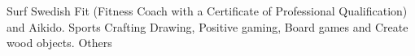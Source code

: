 \begin{cvhonors}
  \cvhonor
    {Surf}
    {Swedish Fit (Fitness Coach with a Certificate of Professional Qualification) and Aikido.}
    {}
    {Sports}
  \cvhonor
    {Crafting}
    {Drawing, Positive gaming, Board games and Create wood objects.}
    {}
    {Others}
\end{cvhonors}
